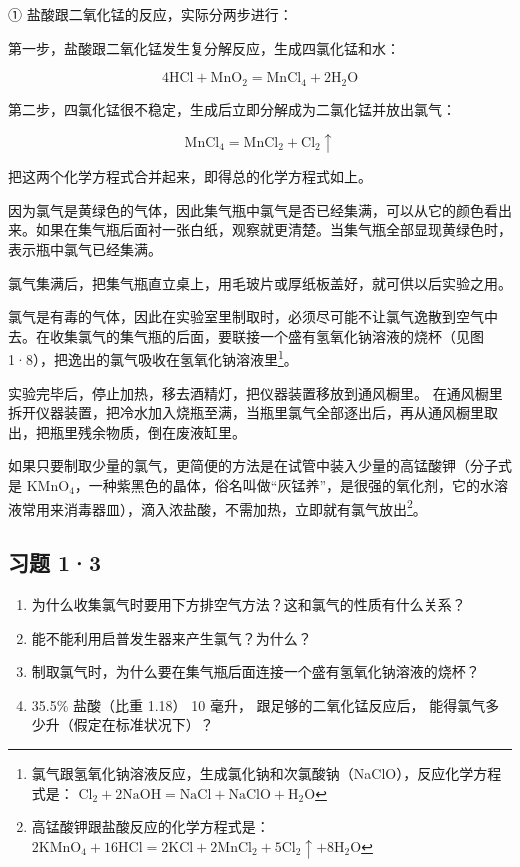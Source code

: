 ① 盐酸跟二氧化锰的反应，实际分两步进行：

第一步，盐酸跟二氧化锰发生复分解反应，生成四氯化锰和水：

\[
4 \mathrm{HCl} + \mathrm{MnO} _ {2} = \mathrm{MnCl} _ {4} + 2 \mathrm{H} _ {2} \mathrm{O}
\]

第二步，四氯化锰很不稳定，生成后立即分解成为二氯化锰并放出氯气：

\[
\mathrm{MnCl} _ {4} = \mathrm{MnCl} _ {2} + \mathrm{Cl} _ {2} \uparrow
\]

把这两个化学方程式合并起来，即得总的化学方程式如上。

因为氯气是黄绿色的气体，因此集气瓶中氯气是否已经集满，可以从它的颜色看出来。如果在集气瓶后面衬一张白纸，观察就更清楚。当集气瓶全部显现黄绿色时，表示瓶中氯气已经集满。

氯气集满后，把集气瓶直立桌上，用毛玻片或厚纸板盖好，就可供以后实验之用。

氯气是有毒的气体，因此在实验室里制取时，必须尽可能不让氯气逸散到空气中去。在收集氯气的集气瓶的后面，要联接一个盛有氢氧化钠溶液的烧杯（见图1·8），把逸出的氯气吸收在氢氧化钠溶液里\footnote{氯气跟氢氧化钠溶液反应，生成氯化钠和次氯酸钠（NaClO），反应化学方程式是：
  \(\mathrm{Cl}_{2} + 2\mathrm{NaOH} = \mathrm{NaCl} + \mathrm{NaClO} + \mathrm{H}_{2}\mathrm{O}\)}。

实验完毕后，停止加热，移去酒精灯，把仪器装置移放到通风橱里。
在通风橱里拆开仪器装置，把冷水加入烧瓶至满，当瓶里氯气全部逐出后，再从通风橱里取出，把瓶里残余物质，倒在废液缸里。

如果只要制取少量的氯气，更简便的方法是在试管中装入少量的高锰酸钾（分子式是
\(\mathrm{KMnO_4}\)，一种紫黑色的晶体，俗名叫做``灰锰养''，是很强的氧化剂，它的水溶液常用来消毒器皿），滴入浓盐酸，不需加热，立即就有氯气放出\footnote{高锰酸钾跟盐酸反应的化学方程式是：
  \(2\mathrm{KMnO}_{4} + 16\mathrm{HCl} = 2\mathrm{KCl} + 2\mathrm{MnCl}_{2} + 5\mathrm{Cl}_{2}\uparrow + 8\mathrm{H}_{2}\mathrm{O}\)}。

\subsection{习题 1·3}

\begin{enumerate}
\item
  为什么收集氯气时要用下方排空气方法？这和氯气的性质有什么关系？
\item
  能不能利用启普发生器来产生氯气？为什么？
\item
  制取氯气时，为什么要在集气瓶后面连接一个盛有氢氧化钠溶液的烧杯？
\item
  35.5\% 盐酸（比重 1.18） 10 毫升， 跟足够的二氧化锰反应后，
  能得氯气多少升（假定在标准状况下）？
\end{enumerate}

